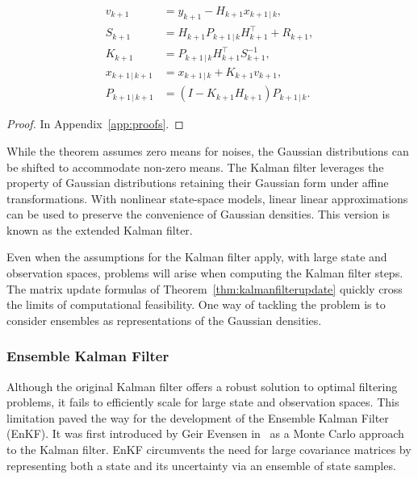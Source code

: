\begin{theorem}
\begin{enumerate}
\begin{subequations}
                \begin{align}
                    v_{k+1} &= y_{k+1} - H_{k+1}x_{k+1 \, \vert \, k},\\
                    S_{k+1} &= H_{k+1} P_{k+1\,\vert\,k} H_{k+1}^{\top} + R_{k+1},\\
                    K_{k+1} &= P_{k+1\,\vert\,k}  H_{k+1}^{\top} S_{k+1}^{-1},\\
                    x_{k+1\,\vert\,k+1} &= x_{k+1\,\vert\,k} + K_{k+1} v_{k+1},\\
                    P_{k+1\,\vert\,k+1} &= (I-K_{k+1}H_{k+1})P_{k+1\,\vert\,k}. \label{eq:kalmanposteriorcov}
                \end{align}
            \end{subequations}
    \end{enumerate}
\end{theorem}
\begin{proof}
    In Appendix~\ref{app:proofs}.
\end{proof}
While the theorem assumes zero means for noises, the Gaussian distributions can be shifted to accommodate non-zero means.
The Kalman filter leverages the property of Gaussian distributions retaining their Gaussian form under affine transformations.
With nonlinear state-space models, linear linear approximations can be used to preserve the convenience of Gaussian densities.
This version is known as the extended Kalman filter.

Even when the assumptions for the Kalman filter apply, with large state and observation spaces, problems will arise when computing the Kalman filter steps.
The matrix update formulas of Theorem~\ref{thm:kalmanfilterupdate} quickly cross the limits of computational feasibility.
One way of tackling the problem is to consider ensembles as representations of the Gaussian densities.

\subsubsection{Ensemble Kalman Filter}
Although the original Kalman filter offers a robust solution to optimal filtering problems, it fails to efficiently scale for large state and observation spaces.
This limitation paved the way for the development of the Ensemble Kalman Filter (EnKF).
It was first introduced by Geir Evensen in~\cite{evensen1994} as a Monte Carlo approach to the Kalman filter.
EnKF circumvents the need for large covariance matrices by representing both a state and its uncertainty via an ensemble of state samples.

